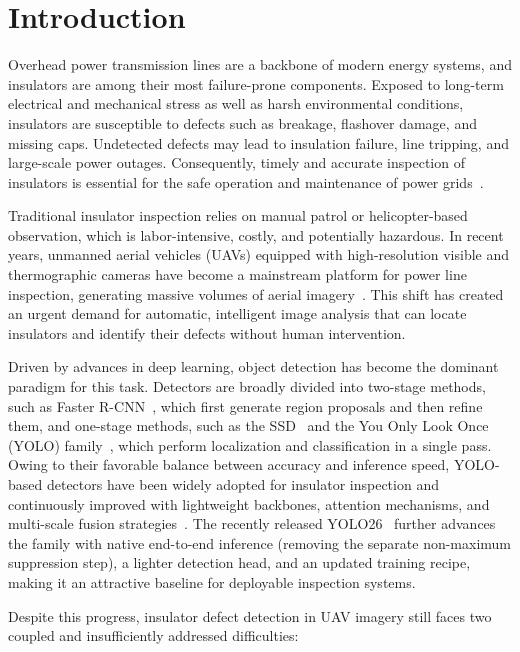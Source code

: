 \documentclass[sensors,article,submit,pdftex,moreauthors]{Definitions/mdpi}
\begin{document}
\section{Introduction}

Overhead power transmission lines are a backbone of modern energy systems, and insulators are among their most failure-prone components. Exposed to long-term electrical and mechanical stress as well as harsh environmental conditions, insulators are susceptible to defects such as breakage, flashover damage, and missing caps. Undetected defects may lead to insulation failure, line tripping, and large-scale power outages. Consequently, timely and accurate inspection of insulators is essential for the safe operation and maintenance of power grids~\cite{tao2020detection,liu2023summary}.

Traditional insulator inspection relies on manual patrol or helicopter-based observation, which is labor-intensive, costly, and potentially hazardous. In recent years, unmanned aerial vehicles (UAVs) equipped with high-resolution visible and thermographic cameras have become a mainstream platform for power line inspection, generating massive volumes of aerial imagery~\cite{luo2023uav,santos2024uav}. This shift has created an urgent demand for automatic, intelligent image analysis that can locate insulators and identify their defects without human intervention.

Driven by advances in deep learning, object detection has become the dominant paradigm for this task. Detectors are broadly divided into two-stage methods, such as Faster R-CNN~\cite{ren2017faster}, which first generate region proposals and then refine them, and one-stage methods, such as the SSD~\cite{liu2016ssd} and the You Only Look Once (YOLO) family~\cite{redmon2016yolo}, which perform localization and classification in a single pass. Owing to their favorable balance between accuracy and inference speed, YOLO-based detectors have been widely adopted for insulator inspection and continuously improved with lightweight backbones, attention mechanisms, and multi-scale fusion strategies~\cite{zhang2023lightweight,han2023lightweight,zheng2022insulator}. The recently released YOLO26~\cite{ultralytics2026yolo26} further advances the family with native end-to-end inference (removing the separate non-maximum suppression step), a lighter detection head, and an updated training recipe, making it an attractive baseline for deployable inspection systems.

Despite this progress, insulator defect detection in UAV imagery still faces two coupled and insufficiently addressed difficulties:
\end{document}
